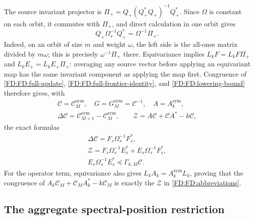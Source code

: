 The source invariant projector is
\(\Pi_+=Q_+(Q_+^*Q_+)^{-1}Q_+^*\).  Since \(\Omega\) is constant
on each orbit, it commutes with \(\Pi_+\), and direct calculation in
one orbit gives
\[
Q_+\Omega_s^{-1}Q_+^*=\Omega^{-1}\Pi_+.
\]
Indeed, on an orbit of size \(m\) and weight \(\omega\), the left
side is the all-ones matrix divided by \(m\omega\); this is precisely
\(\omega^{-1}\Pi_+\) there.  Equivariance implies
\(L_kF=L_kF\Pi_+\) and \(L_kE_+=L_kE_+\Pi_+\): averaging any
source vector before applying an equivariant map has the same invariant
component as applying the map first.  Congruence of
\eqref{FD:FD:full-update}, \eqref{FD:FD:full-frontier-identity}, and
\eqref{FD:FD:lowering-bound} therefore gives, with
\begin{equation}
\begin{gathered}
\mathcal C=\mathcal C_M^{\mathrm{sym}},\quad
G=G_M^{\mathrm{sym}}=\mathcal C^{-1},\quad A=A_k^{\mathrm{sym}},\\
\Delta\mathcal C=\mathcal C_{M+1}^{\mathrm{sym}}-
\mathcal C_M^{\mathrm{sym}},\qquad
\mathcal Z=A\mathcal C+\mathcal CA^*-k\mathcal C,
\end{gathered}
\tag{FD.26}\label{FD:FD:abbreviations}
\end{equation}
the exact formulas
\begin{equation}
\begin{gathered}
\Delta\mathcal C=F_s\Omega_s^{-1}F_s^*,\\
\mathcal Z=F_s\Omega_s^{-1}E_s^*+E_s\Omega_s^{-1}F_s^*,\\
E_s\Omega_s^{-1}E_s^*\preceq\Gamma_{k,M}\mathcal C.
\end{gathered}
\tag{FD.27}\label{FD:FD:restricted-identities}
\end{equation}
For the operator term, equivariance also gives
\(L_kA_k=A_k^{\mathrm{sym}}L_k\), proving that the congruence of
\(A_k\mathcal C_M+\mathcal C_MA_k^*-k\mathcal C_M\) is exactly the
\(\mathcal Z\) in \eqref{FD:FD:abbreviations}.

\subsection{The aggregate spectral-position restriction}

